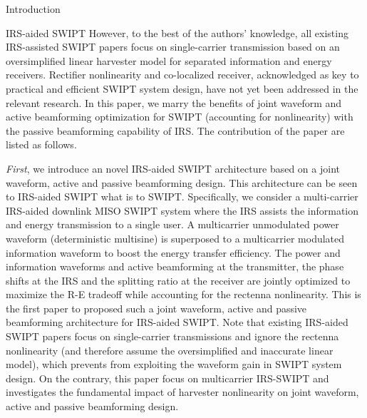 \documentclass[journal]{IEEEtran}
\begin{document}
\begin{section}{Introduction}
\begin{subsection}{IRS-aided SWIPT}
			However, to the best of the authors' knowledge, all existing IRS-assisted SWIPT papers focus on single-carrier transmission based on an oversimplified linear harvester model for separated information and energy receivers. Rectifier nonlinearity and co-localized receiver, acknowledged as key to practical and efficient SWIPT system design, have not yet been addressed in the relevant research. In this paper, we marry the benefits of joint waveform and active beamforming optimization for SWIPT (accounting for nonlinearity) with the passive beamforming capability of IRS. The contribution of the paper are listed as follows.

			\textit{First}, we introduce an novel IRS-aided SWIPT architecture based on a joint waveform, active and passive beamforming design. This architecture can be seen to IRS-aided SWIPT what \cite{Clerckx2018b} is to SWIPT. Specifically, we consider a multi-carrier IRS-aided downlink MISO SWIPT system where the IRS assists the information and energy transmission to a single user. A multicarrier unmodulated power waveform (deterministic multisine) is superposed to a multicarrier modulated information waveform to boost the energy transfer efficiency. The power and information waveforms and active beamforming at the transmitter, the phase shifts at the IRS and the splitting ratio at the receiver are jointly optimized to maximize the R-E tradeoff while accounting for the rectenna nonlinearity. This is the first paper to proposed such a joint waveform, active and passive beamforming architecture for IRS-aided SWIPT. Note that existing IRS-aided SWIPT papers \cite{Wu2019b,Tang2019,Wu2019c,Pan2019a} focus on single-carrier transmissions and ignore the rectenna nonlinearity (and therefore assume the oversimplified and inaccurate linear model), which prevents from exploiting the waveform gain in SWIPT system design. On the contrary, this paper focus on multicarrier IRS-SWIPT and investigates the fundamental impact of harvester nonlinearity on joint waveform, active and passive beamforming design.


\end{subsection}
\end{section}
\end{document}
